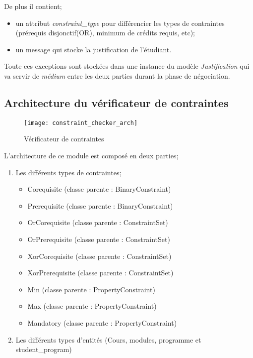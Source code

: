 De plus il contient;
\begin{itemize}
\item un attribut \textit{constraint\_type} pour différencier les types de contraintes (prérequis disjonctif(OR), minimum de crédits requis, etc);
\item un message qui stocke la justification de l'étudiant.
\end{itemize}

Toute ces exceptions sont stockées dans une instance du modèle \textit{Justification} qui va servir de \textit{médium} entre les deux parties durant la phase de négociation.

\subsection{Architecture du vérificateur de contraintes}
\label{constraintchecker}
\begin{figure}[H]
\centering
\caption{Vérificateur de contraintes}
\label{fig:constraint_checker_arch}
\texttt{[image: constraint\_checker\_arch]}
\end{figure}

L'architecture de ce module est composé en deux parties;
\begin{enumerate}
  \item Les différents types de contraintes;
    \begin{itemize}
    \item Corequisite (classe parente : BinaryConstraint)
    \item Prerequisite (classe parente : BinaryConstraint)
    \item OrCorequisite (classe parente : ConstraintSet)
    \item OrPrerequisite (classe parente : ConstraintSet)
    \item XorCorequisite (classe parente : ConstraintSet)
    \item XorPrerequisite (classe parente : ConstraintSet)
    \item Min (classe parente : PropertyConstraint)
    \item Max (classe parente : PropertyConstraint)
    \item Mandatory (classe parente : PropertyConstraint)
    \end{itemize} 
  \item Les différents types d'entités (Cours, modules, programme et student\_program)
\end{enumerate}

